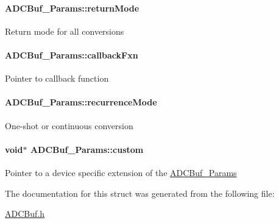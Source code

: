\paragraph[{return\+Mode}]{ A\+D\+C\+Buf\+\_\+\+Params\+::return\+Mode}\label{struct_a_d_c_buf___params_a17b3cdab5de5cfb81854b86f0cfc0ec1}
Return mode for all conversions 
\paragraph[{callback\+Fxn}]{ A\+D\+C\+Buf\+\_\+\+Params\+::callback\+Fxn}\label{struct_a_d_c_buf___params_a29f674ee9b6739607119d6b50f244e17}
Pointer to callback function 
\paragraph[{recurrence\+Mode}]{ A\+D\+C\+Buf\+\_\+\+Params\+::recurrence\+Mode}\label{struct_a_d_c_buf___params_a559d4f3324bdbee8f6b6140a6d7264fb}
One-\/shot or continuous conversion 
\paragraph[{custom}]{\setlength{\rightskip}{0pt plus 5cm}void$\ast$ A\+D\+C\+Buf\+\_\+\+Params\+::custom}\label{struct_a_d_c_buf___params_a72c7ec51318ec2f8fcf5d2ff37de33e3}
Pointer to a device specific extension of the \hyperlink{struct_a_d_c_buf___params}{A\+D\+C\+Buf\+\_\+\+Params} 

The documentation for this struct was generated from the following file\+:\begin{DoxyCompactItemize}
\item 
\hyperlink{_a_d_c_buf_8h}{A\+D\+C\+Buf.\+h}\end{DoxyCompactItemize}
